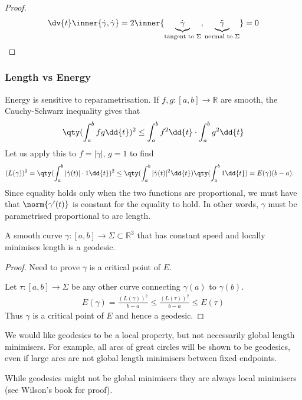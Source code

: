 \begin{proof}
	\begin{align*}
		\dv{t} \inner{\dot \gamma, \dot \gamma} = 2 \inner{\underbrace{\dot \gamma}_{\text{tangent to } \Sigma}, \underbrace{\ddot \gamma}_{\text{normal to } \Sigma}} = 0
	\end{align*}
\end{proof} 

\subsubsection{Length vs Energy}

Energy is sensitive to reparametrisation.
If $f, g \colon [a,b] \to \mathbb R$ are smooth, the Cauchy-Schwarz inequality gives that
\begin{align*}
	\qty(\int_a^b fg \dd{t})^2 \leq \int_a^b f^2 \dd{t} \cdot \int_a^b g^2 \dd{t}
\end{align*}
Let us apply this to $f = |\dot{\gamma}|$, $g = 1$ to find
\begin{align*}
	(L(\gamma))^2 = \qty(\int_{a}^{b} |\dot{\gamma}(t)| \cdot 1 \dd{t})^2 &\leq \qty(\int_{a}^{b} |\dot{\gamma}(t)|^2 \dd{t}) \qty(\int_{a}^{b} 1 \dd{t}) = E(\gamma)(b-a).
\end{align*}
Since equality holds only when the two functions are proportional, we must have that $\norm{\gamma'(t)}$ is constant for the equality to hold.
In other words, $\gamma$ must be parametrised proportional to arc length.

\begin{corollary} \label{cor:3.3}
	A smooth curve $\gamma: [a, b] \to \Sigma \subset \mathbb{R}^3$ that has constant speed and locally minimises length is a geodesic.
\end{corollary}

\begin{proof}
	Need to prove $\gamma$ is a critical point of $E$.

	Let $\tau : [a, b] \to \Sigma$ be any other curve connecting $\gamma(a)$ to $\gamma(b)$.
	\begin{align*}
		E(\gamma) = \frac{(L(\gamma))^2}{b - a} \leq \frac{(L(\tau))^2}{b - a} \leq E(\tau)
	\end{align*} 
	Thus $\gamma$ is a critical point of $E$ and hence a geodesic.
\end{proof} 

\begin{remark}
	We would like geodesics to be a local property, but not necessarily global length minimisers.
	For example, all arcs of great circles will be shown to be geodesics, even if large arcs are not global length minimisers between fixed endpoints.

	While geodesics might not be global minimisers they are always local minimisers (see Wilson's book for proof).
\end{remark}

